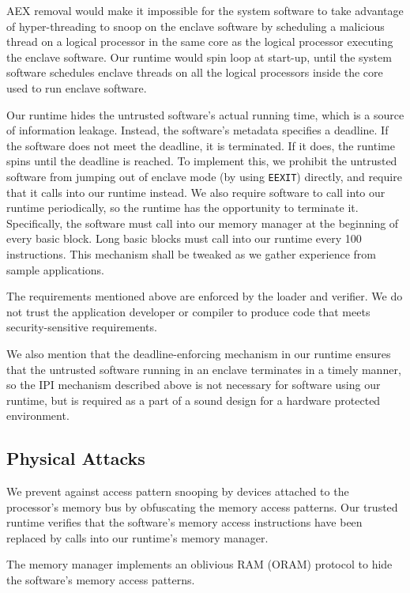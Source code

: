 AEX removal would make it impossible for the system software to take advantage
of hyper-threading to snoop on the enclave software by scheduling a malicious
thread on a logical processor in the same core as the logical processor
executing the enclave software. Our runtime would spin loop at start-up, until
the system software schedules enclave threads on all the logical processors
inside the core used to run enclave software.

Our runtime hides the untrusted software's actual running time, which is a
source of information leakage. Instead, the software's metadata specifies a
deadline. If the software does not meet the deadline, it is terminated. If it
does, the runtime spins until the deadline is reached. To implement this, we
prohibit the untrusted software from jumping out of enclave mode (by using
\texttt{EEXIT}) directly, and require that it calls into our runtime instead.
We also require software to call into our runtime periodically, so the runtime
has the opportunity to terminate it. Specifically, the software must call into
our memory manager at the beginning of every basic block. Long basic blocks
must call into our runtime every 100 instructions. This mechanism shall be
tweaked as we gather experience from sample applications.

The requirements mentioned above are enforced by the loader and verifier. We do
not trust the application developer or compiler to produce code that meets
security-sensitive requirements.

We also mention that the deadline-enforcing mechanism in our runtime ensures
that the untrusted software running in an enclave terminates in a timely
manner, so the IPI mechanism described above is not necessary for software
using our runtime, but is required as a part of a sound design for a hardware
protected environment.


\subsection{Physical Attacks}

We prevent against access pattern snooping by devices attached to the
processor's memory bus by obfuscating the memory access patterns. Our trusted
runtime verifies that the software's memory access instructions have been
replaced by calls into our runtime's memory manager.

The memory manager
implements an oblivious RAM (ORAM) protocol \cite{stefanov2013path} to hide the
software's memory access patterns.

